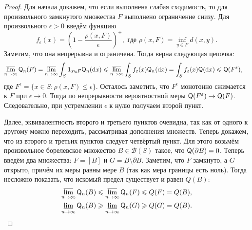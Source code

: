 \begin{proof}
	Для начала докажем, что если выполнена слабая сходимость, то для произвольного замкнутого множества $F$ выполнено ограничение снизу. Для произвольного $\epsilon > 0$ введём функцию
	\begin{equation}
		f_{\epsilon}(x) = \left(1 - \frac{\rho(x, F)}{\epsilon}\right)^{+}, \text{ где } \rho(x, F) = \inf_{y \in F} d(x, y).
	\end{equation}
	Заметим, что она непрерывна и ограничена. Тогда верна следующая цепочка:
	\begin{align}
		\varlimsup_{n \to \infty} \mathsf{Q}_{n}(F)
		&= \varlimsup_{n \to \infty} \int_{S} \mathbf{1}_{x \in F}\mathsf{Q}_{n}(\dd x)
		\leqslant \varlimsup_{n \to \infty} \int_{S} f_{\varepsilon}(x)\mathsf{Q}_{n}(\dd x)
		= \int_{S} f_{\varepsilon}(x)\mathsf{Q}(\dd x)
		\leqslant \mathsf{Q}(F^{\varepsilon}),
	\end{align}
	где $F^{\epsilon} = \{x \in S \colon \rho(x, F) \leq \epsilon\}$. Осталось заметить, что $F^{\epsilon}$ монотонно сжимается к $F$ при $\epsilon \to 0$. Тогда по непрерывности вероятностной меры $\mathsf{Q}(F^{\varepsilon}) \to \mathsf{Q}(F)$. Следовательно, при устремлении $\epsilon$ к нулю получаем второй пункт.

	Далее, эквивалентность второго и третьего пунктов очевидна, так как от одного к другому можно переходить, рассматривая дополнения множеств. Теперь докажем, что из второго и третьих пунктов следует четвёртый пункт. Для этого возьмём произвольное борелевское множество $B \in \mathcal{B}(S)$ такое, что $\mathsf{Q}(\partial B) = 0$. Теперь введём два множества: $F = [B]$ и $G = B \setminus \partial B$. Заметим, что $F$ замкнуто, а $G$ открыто, причём их меры равны мере $B$ (так как мера границы есть ноль). Тогда несложно показать, что искомый предел существует и равен $Q(B)$:
	\begin{align}
		\varlimsup_{n \to \infty} \mathsf{Q}_{n}(B) &\leqslant \varlimsup_{n \to \infty} \mathsf{Q}_{n}(F) \leqslant Q(F) = Q(B), \\
		\varliminf_{n \to \infty} \mathsf{Q}_{n}(B) &\geqslant \varliminf_{n \to \infty} \mathsf{Q}_{n}(G) \geqslant Q(G) = Q(B).
	\end{align}


\end{proof}
